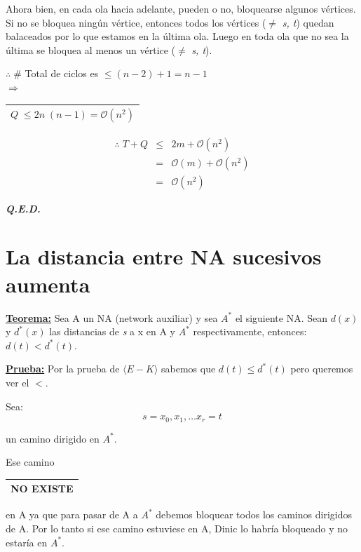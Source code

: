 \documentclass[12pt,a4paper]{report}
\newcounter{neq}
\newcommand{\QED}{\hfill \textit{\textbf{Q.E.D.}}}
\begin{document}
				\par Ahora bien, en cada ola hacia adelante, pueden o no, bloquearse algunos vértices. Si no se bloquea ningún vértice, entonces todos los vértices ($\neq$ \textit{s, t}) quedan balaceados por lo que estamos en la última ola. Luego en toda ola que no sea la última se bloquea al menos un vértice ($\neq$ \textit{s, t}).
				\begin{center}
					$\therefore \; \#$ Total de ciclos es $\leq (n - 2) + 1 = n - 1$ \\
					\vspace{3mm}
					$\Rightarrow$ \begin{tabular}{|c|} \hline $Q \; \leq 2 n \; (n - 1) = \mathcal{O}(n^{2})$ \\ \hline \end{tabular}
				\end{center}

				\begin{eqnarray}
					\nonumber \therefore \; T + Q &\leq & 2 m + \mathcal{O}(n^{2}) \\
					\nonumber &=& \mathcal{O}(m) + \mathcal{O}(n^{2}) \\
					\nonumber &=& \mathcal{O}(n^{2})
				\end{eqnarray}

		\QED

	\section{La distancia entre NA sucesivos aumenta}
		\textbf{\underline{Teorema:}} Sea A un NA (network auxiliar) y sea $A^{*}$ el siguiente NA. Sean $d(x)$ y $d^{*}(x)$ las distancias de \textit{s} a x en A y $A^{*}$ respectivamente, entonces: $d(t) < d^{*}(t)$.

		\textbf{\underline{Prueba:}} Por la prueba de $\langle E-K \rangle$ sabemos que $d(t) \leq d^{*}(t)$ pero queremos ver el $<$.
			\par Sea:
			\[ s = x_{0}, x_{1}, \dotsc x_{r} = t \]
			\par un camino dirigido en $A^{*}$.
			\par Ese camino \begin{tabular}{|c|} \hline NO EXISTE \\\hline \end{tabular} en A ya que para pasar de A a $A^{*}$ debemos bloquear todos los caminos dirigidos de A. Por lo tanto si ese camino estuviese en A, Dinic lo habría bloqueado y no estaría en $A^{*}$.
\end{document}
